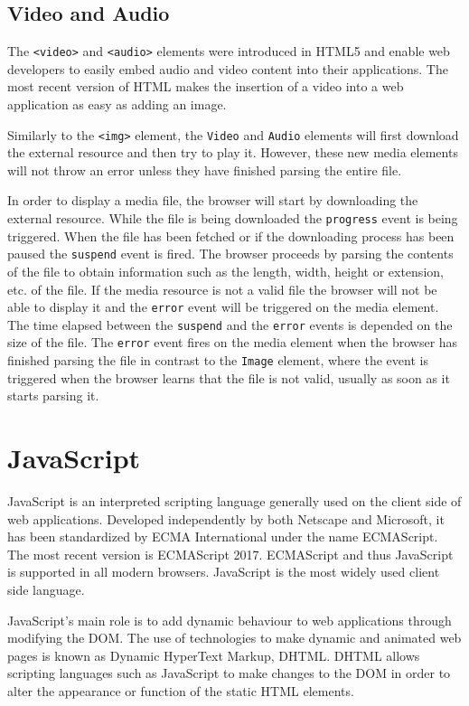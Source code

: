 \documentclass[10pt,a4paper,twoside]{book}
\begin{document}
\subsection{Video and Audio}

The \texttt{<video>} and \texttt{<audio>} elements were introduced in HTML5 and enable web developers to easily embed audio and video content into their applications. The most recent version of HTML makes the insertion of a video into a web application as easy as adding an image. \cite{berjon2014html}

Similarly to the \texttt{<img>} element, the \texttt{Video} and  \texttt{Audio} elements will first download the external resource and then try to play it. However, these new media elements will not throw an error unless they have finished parsing the entire file. \cite{berjon2014html}

In order to display a media file, the browser will start by downloading the external resource. While the file is being downloaded the \texttt{progress} event is being triggered. When the file has been fetched or if the downloading process has been paused the \texttt{suspend} event is fired. The browser proceeds by parsing the contents of the file to obtain information such as the length, width, height or extension, etc. of the file. If the media resource is not a valid file the browser will not be able to display it and the \texttt{error} event will be triggered on the media element. The time elapsed between the \texttt{suspend} and the \texttt{error} events is depended on the size of the file. The \texttt{error} event fires on the media element when the browser has finished parsing the file in contrast to the \texttt{Image} element, where the event is triggered when the browser learns that the file is not valid, usually as soon as it starts parsing it. \cite{berjon2014html}

\section{JavaScript}
JavaScript is an interpreted scripting language generally used on the client side of web applications. Developed independently by both Netscape and Microsoft, it has been standardized by ECMA International under the name ECMAScript.
The most recent version is ECMAScript 2017. ECMAScript and thus JavaScript is supported in all modern browsers. JavaScript is the most widely used client side language. \cite{javascriptstats, javascriptabout}

JavaScript's main role is to add dynamic behaviour to web applications through modifying the DOM. The use of technologies to make dynamic and animated web pages is known as Dynamic HyperText Markup, DHTML. DHTML allows scripting languages such as JavaScript to make changes to the DOM in order to alter the appearance or function of the static HTML elements.
\end{document}
